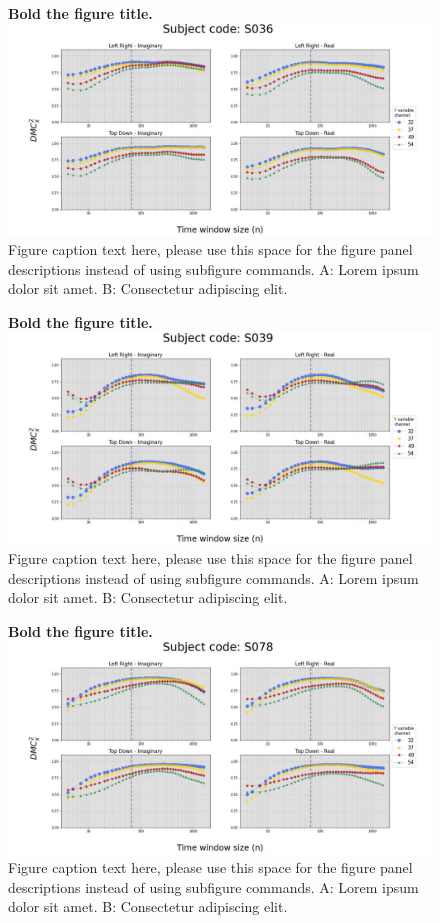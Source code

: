 \documentclass[10pt,letterpaper]{article}
\begin{document}
\begin{figure}[!h]
  \caption{{\bf Bold the figure title.}
  \includegraphics[width=.9\textwidth]{../output/figs/stats/S036.jpg}
  Figure caption text here, please use this space for the figure panel descriptions instead of using subfigure commands. A: Lorem ipsum dolor sit amet. B: Consectetur adipiscing elit.}
  \label{fig:4ts36}
\end{figure}

\begin{figure}[!h]
    \caption{{\bf Bold the figure title.}
    \includegraphics[width=.9\textwidth]{../output/figs/stats/S039.jpg}
    Figure caption text here, please use this space for the figure panel descriptions instead of using subfigure commands. A: Lorem ipsum dolor sit amet. B: Consectetur adipiscing elit.}
    \label{fig:4ts39}
\end{figure}

\begin{figure}[!h]
    \caption{{\bf Bold the figure title.}
    \includegraphics[width=.9\textwidth]{../output/figs/stats/S078.jpg}
      Figure caption text here, please use this space for the figure panel descriptions instead of using subfigure commands. A: Lorem ipsum dolor sit amet. B: Consectetur adipiscing elit.}
    \label{fig:4ts78}
\end{figure}
\end{document}

